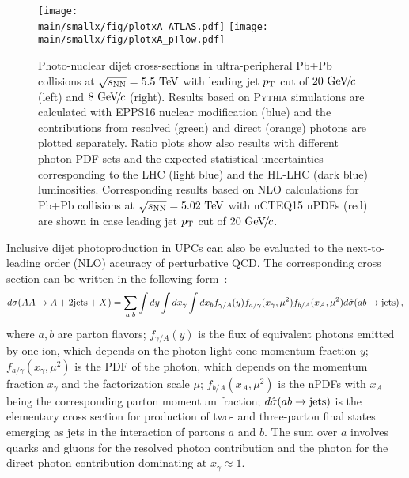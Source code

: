 \documentclass[../report.tex]{subfiles}
\providecommand{\main}{..}
\begin{document}
\begin{figure}
\texttt{[image: \\main/smallx/fig/plotxA\_ATLAS.pdf]}
\texttt{[image: \\main/smallx/fig/plotxA\_pTlow.pdf]}
\caption{Photo-nuclear dijet cross-sections in ultra-peripheral Pb+Pb collisions at $\sqrt{s_{\mathrm{NN}}} = 5.5~\text{TeV}$ with leading jet $p\sb{\scriptstyle\mathrm{T}}$ cut of $20~\text{GeV}\!/\mspace{-2mu}c$ (left) and $8~\text{GeV}\!/\mspace{-2mu}c$ (right). Results based on \textsc{Pythia} simulations are calculated with EPPS16 nuclear modification (blue) and the contributions from resolved (green) and direct (orange) photons are plotted separately. Ratio plots show also results with different photon PDF sets and the expected statistical uncertainties corresponding to the LHC (light blue) and the HL-LHC (dark blue) luminosities. Corresponding results based on NLO calculations for Pb+Pb collisions at $\sqrt{s_{\mathrm{NN}}} = 5.02~\text{TeV}$ with nCTEQ15 nPDFs (red) are shown in case leading jet $p\sb{\scriptstyle\mathrm{T}}$ cut of $20~\text{GeV}\!/\mspace{-2mu}c$.}
\label{fig:UPCdijetNPDF}
\end{figure}

Inclusive dijet photoproduction in UPCs can also be evaluated to the next-to-leading order (NLO) accuracy of perturbative QCD. The corresponding cross section can be written in the following form~\cite{Klasen:2002xb}:
 \begin{eqnarray}
 d\sigma(AA \to A+{\rm 2 jets}+X) = \sum_{a,b} \int dy \int dx_{\gamma} \int dx_b f_{\gamma/A}(y)f_{a/\gamma}(x_{\gamma},\mu^2)f_{b/A}(x_A,\mu^2) d\hat{\sigma}(ab \to {\rm jets}) \,,
\label{eq:cs_jets}
\end{eqnarray}
where $a,b$ are parton flavors; $f_{\gamma/A}(y)$ is the flux of equivalent photons emitted by one ion,
which depends on the photon light-cone momentum fraction $y$;
$f_{a/\gamma}(x_{\gamma},\mu^2)$ is the PDF of the photon, which depends on the momentum fraction $x_{\gamma}$ 
and the factorization scale $\mu$; $f_{b/A}(x_A,\mu^2)$ is the nPDFs with $x_A$ being the corresponding parton momentum fraction;
$d\hat{\sigma}(ab \to {\rm jets})$ is the elementary cross section for production of two- and three-parton final states emerging as jets
 in the interaction of partons $a$ and $b$. The sum over $a$ involves quarks and gluons for the resolved photon contribution 
 and the photon for the direct photon contribution dominating at $x_{\gamma} \approx 1$.
 
\end{document}
